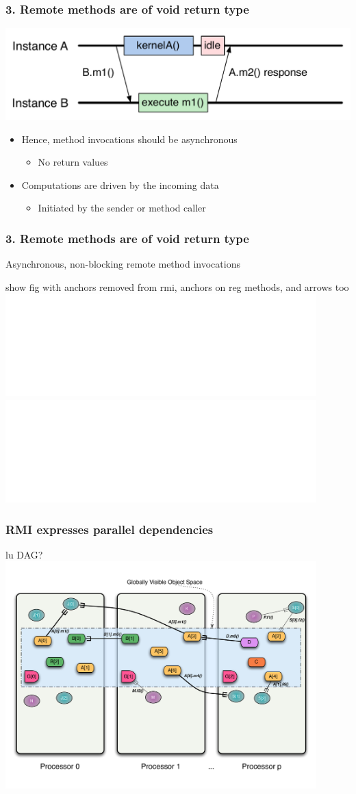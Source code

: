 \begin{frame}
\frametitle{3. Remote methods are of void return type}
  \begin{center}
    \includegraphics[width=\textwidth]{../figures/objectSequenceAsync.pdf}
  \end{center}
  \begin{itemize}
  \item Hence, method invocations should be asynchronous
    \begin{itemize}
    \item No return values
    \end{itemize}
  \item Computations are driven by the incoming data
    \begin{itemize}
    \item Initiated by the sender or method caller
    \end{itemize}
  \end{itemize}
\end{frame}


\begin{frame}
\frametitle{3. Remote methods are of void return type}
	Asynchronous, non-blocking remote method invocations
	\pause
	\begin{center}
        show fig with anchors removed from rmi, anchors on reg methods, and arrows too
        \includegraphics<1>[width=0.9\textwidth]{../figures/progmodel/11-global-methods.pdf}
        \includegraphics<2>[width=0.9\textwidth]{../figures/progmodel/12-asyn-nonblock-rmi.pdf}
	\end{center}
\end{frame}


\begin{frame}
\frametitle{RMI expresses parallel dependencies}
	\begin{center}
        lu DAG?
        \includegraphics[width=0.9\textwidth]{../figures/progmodel/11-global-methods.pdf}
	\end{center}
\end{frame}


